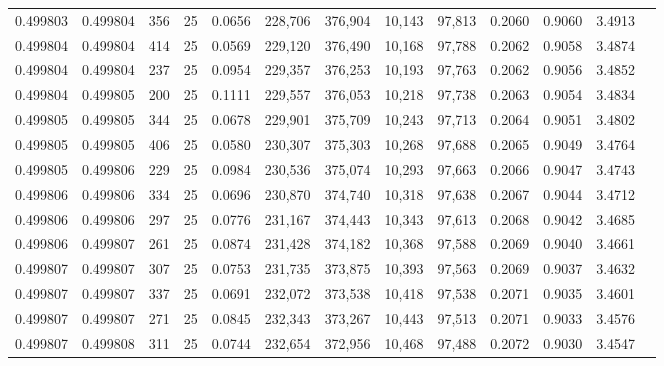 \begin{tabular}{rrrrrrrrrrrrr}
0.499803 & 0.499804 &   356 &  25 &                                     0.0656 & 228,706 & 376,904 &  10,143 &  97,813 & 0.2060 & 0.9060 & 3.4913 \\
0.499804 & 0.499804 &   414 &  25 &                                     0.0569 & 229,120 & 376,490 &  10,168 &  97,788 & 0.2062 & 0.9058 & 3.4874 \\
0.499804 & 0.499804 &   237 &  25 &                                     0.0954 & 229,357 & 376,253 &  10,193 &  97,763 & 0.2062 & 0.9056 & 3.4852 \\
0.499804 & 0.499805 &   200 &  25 &                                     0.1111 & 229,557 & 376,053 &  10,218 &  97,738 & 0.2063 & 0.9054 & 3.4834 \\
0.499805 & 0.499805 &   344 &  25 &                                     0.0678 & 229,901 & 375,709 &  10,243 &  97,713 & 0.2064 & 0.9051 & 3.4802 \\
0.499805 & 0.499805 &   406 &  25 &                                     0.0580 & 230,307 & 375,303 &  10,268 &  97,688 & 0.2065 & 0.9049 & 3.4764 \\
0.499805 & 0.499806 &   229 &  25 &                                     0.0984 & 230,536 & 375,074 &  10,293 &  97,663 & 0.2066 & 0.9047 & 3.4743 \\
0.499806 & 0.499806 &   334 &  25 &                                     0.0696 & 230,870 & 374,740 &  10,318 &  97,638 & 0.2067 & 0.9044 & 3.4712 \\
0.499806 & 0.499806 &   297 &  25 &                                     0.0776 & 231,167 & 374,443 &  10,343 &  97,613 & 0.2068 & 0.9042 & 3.4685 \\
0.499806 & 0.499807 &   261 &  25 &                                     0.0874 & 231,428 & 374,182 &  10,368 &  97,588 & 0.2069 & 0.9040 & 3.4661 \\
0.499807 & 0.499807 &   307 &  25 &                                     0.0753 & 231,735 & 373,875 &  10,393 &  97,563 & 0.2069 & 0.9037 & 3.4632 \\
0.499807 & 0.499807 &   337 &  25 &                                     0.0691 & 232,072 & 373,538 &  10,418 &  97,538 & 0.2071 & 0.9035 & 3.4601 \\
0.499807 & 0.499807 &   271 &  25 &                                     0.0845 & 232,343 & 373,267 &  10,443 &  97,513 & 0.2071 & 0.9033 & 3.4576 \\
0.499807 & 0.499808 &   311 &  25 &                                     0.0744 & 232,654 & 372,956 &  10,468 &  97,488 & 0.2072 & 0.9030 & 3.4547 \\

\end{tabular}
